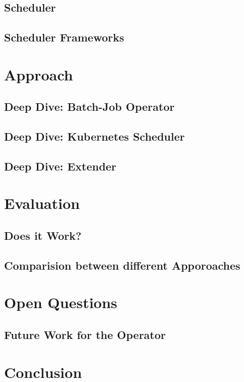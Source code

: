 \section{Scheduler}

\section{Scheduler Frameworks}


\chapter{Approach}

\section{Deep Dive: Batch-Job Operator}

\section{Deep Dive: Kubernetes Scheduler}

\section{Deep Dive: Extender}


\chapter{Evaluation}
\section{Does it Work?}

\section{Comparision between different Apporoaches}


\chapter{Open Questions}

\section{Future Work for the Operator}


\chapter{Conclusion}







